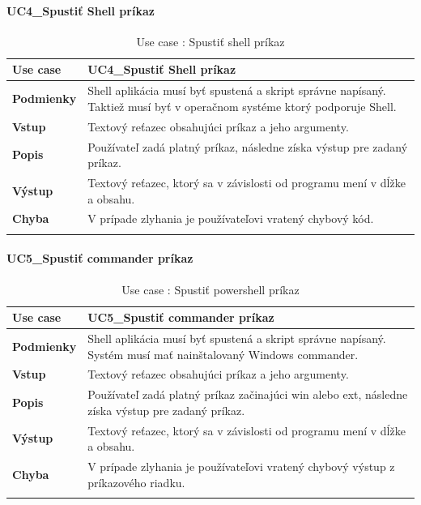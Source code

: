 \paragraph{UC4\_Spustiť Shell príkaz}
\begin{center}
	\begin{longtable}{|p{2.5cm}|p{12.2cm}|}

			\hline
			\textbf{Use case} & UC4\_Spustiť Shell príkaz \\ 
			\hline
			\textbf{Podmienky} & Shell aplikácia musí byť spustená a skript správne napísaný. Taktiež musí byť v operačnom systéme ktorý podporuje Shell. \\ 
			\hline
			\textbf{Vstup} & Textový reťazec obsahujúci príkaz a jeho argumenty.\\
			\hline
			\textbf{Popis} & Používateľ zadá platný príkaz, následne získa výstup pre zadaný príkaz. \\ 
			\hline
			\textbf{Výstup} &Textový reťazec, ktorý sa v závislosti od programu mení v dĺžke a obsahu. \\
			\hline
			\textbf{Chyba} & V prípade zlyhania je používateľovi vratený chybový kód.\\
			\hline
		\caption{Use case : Spustiť shell príkaz}
	\label{table:1}
	
	\end{longtable}
\end{center}

\paragraph{UC5\_Spustiť commander príkaz}
\begin{center}
	\begin{longtable}{|p{2.5cm}|p{12.2cm}|}

			\hline
			\textbf{Use case} & UC5\_Spustiť commander príkaz \\ 
			\hline
			\textbf{Podmienky} & Shell aplikácia musí byť spustená a skript správne napísaný. Systém musí mať nainštalovaný Windows commander.\\ 
			\hline
			\textbf{Vstup} & Textový reťazec obsahujúci príkaz a jeho argumenty.\\
			\hline
			\textbf{Popis} & Používateľ zadá platný príkaz začinajúci win alebo ext, následne získa výstup pre zadaný príkaz. \\ 
			\hline
			\textbf{Výstup} &Textový reťazec, ktorý sa v závislosti od programu mení v dĺžke a obsahu. \\
			\hline
			\textbf{Chyba} & V prípade zlyhania je používateľovi vratený chybový výstup z príkazového riadku.\\
			\hline
	\caption{Use case : Spustiť powershell príkaz}
	\label{table:1}

	\end{longtable}
\end{center}
